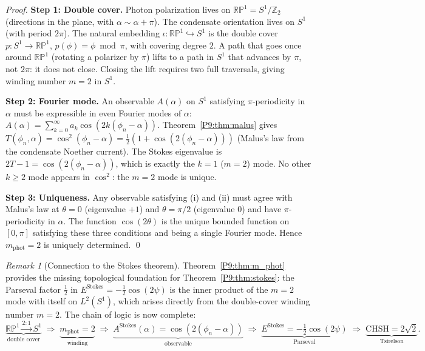 \documentclass[11pt,a4paper]{article}
\theoremstyle{definition}
\theoremstyle{remark}
\newtheorem{remark}[theorem]{Remark}
\newcommand{\CHSH}{\mathrm{CHSH}}
\begin{document}
\begin{proof}
\textbf{Step 1: Double cover.}
Photon polarization lives on $\mathbb{RP}^1 = S^1/\mathbb{Z}_2$ (directions
in the plane, with $\alpha\sim\alpha+\pi$).
The condensate orientation lives on $S^1$ (with period $2\pi$).
The natural embedding $\iota:\mathbb{RP}^1\hookrightarrow S^1$ is the
double cover $p:S^1\to\mathbb{RP}^1$, $p(\phi)=\phi\bmod\pi$,
with covering degree $2$.
A path that goes once around $\mathbb{RP}^1$ (rotating a polarizer by $\pi$)
lifts to a path in $S^1$ that advances by $\pi$, not $2\pi$: it does not close.
Closing the lift requires two full traversals, giving winding number $m=2$ in $S^1$.

\textbf{Step 2: Fourier mode.}
An observable $A(\alpha)$ on $S^1$ satisfying $\pi$-periodicity in $\alpha$
must be expressible in even Fourier modes of $\alpha$:
$A(\alpha) = \sum_{k=0}^\infty a_k\cos(2k(\phi_n-\alpha))$.
Theorem~\ref{P9:thm:malus} gives $T(\phi_n,\alpha) = \cos^2(\phi_n-\alpha)
= \tfrac{1}{2}(1 + \cos(2(\phi_n-\alpha)))$ (Malus's law from
the condensate Noether current).
The Stokes eigenvalue is $2T-1 = \cos(2(\phi_n-\alpha))$,
which is exactly the $k=1$ ($m=2$) mode.
No other $k\geq2$ mode appears in $\cos^2$: the $m=2$ mode is unique.

\textbf{Step 3: Uniqueness.}
Any observable satisfying (i) and (ii) must agree with Malus's law
at $\theta=0$ (eigenvalue $+1$) and $\theta=\pi/2$ (eigenvalue $0$)
and have $\pi$-periodicity in $\alpha$.
The function $\cos(2\theta)$ is the unique bounded function on $[0,\pi]$
satisfying these three conditions and being a single Fourier mode.
Hence $m_\mathrm{phot}=2$ is uniquely determined. \qed
\end{proof}

\begin{remark}[Connection to the Stokes theorem]
\label{P9:rem:stokes_connection}
Theorem~\ref{P9:thm:m_phot} provides the missing topological foundation for
Theorem~\ref{P9:thm:stokes}:
the Parseval factor $\tfrac{1}{2}$ in $E^\mathrm{Stokes}=-\tfrac{1}{2}\cos(2\psi)$
is the inner product of the $m=2$ mode with itself on $L^2(S^1)$,
which arises directly from the double-cover winding number $m=2$.
The chain of logic is now complete:
\begin{equation}
  \underbrace{\mathbb{RP}^1 \xrightarrow{2:1} S^1}_{\text{double cover}}
  \;\Rightarrow\;
  \underbrace{m_\mathrm{phot}=2}_{\text{winding}}
  \;\Rightarrow\;
  \underbrace{A^\mathrm{Stokes}(\alpha)=\cos(2(\phi_n-\alpha))}_{\text{observable}}
  \;\Rightarrow\;
  \underbrace{E^\mathrm{Stokes}=-\tfrac{1}{2}\cos(2\psi)}_{\text{Parseval}}
  \;\Rightarrow\;
  \underbrace{\CHSH=2\sqrt{2}}_{\text{Tsirelson}}.
\end{equation}
\end{remark}
\end{document}
